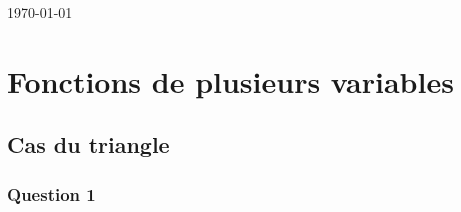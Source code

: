 \documentclass[12pt]{report}
\begin{document}
\begin{titlepage}
	
	
	\vfill\vfill\vfill %
	
	{\large\today} %
	
	
	 
	
	\vfill %
	
\end{titlepage}

\tableofcontents
\part{Fonctions de plusieurs variables}

\chapter{Cas du triangle}
\section{Question 1}
\end{document}
